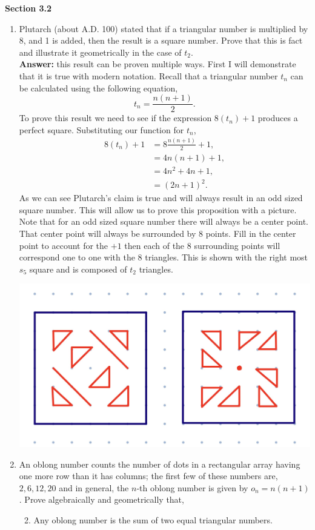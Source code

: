 \documentclass[12pt]{article}
\theoremstyle{homework}
\begin{document}
\textbf{Section 3.2}
\begin{enumerate}
\item Plutarch (about A.D. 100) stated that if a triangular number is multiplied by 8, and 1 is added, then the result is a square number. Prove that this is fact and illustrate it geometrically in the case of $t_2$.\\

\textbf{Answer:} this result can be proven multiple ways. First I will demonstrate that it is true with modern notation. Recall that a triangular number $t_n$ can be calculated using the following equation,
\begin{equation*}
  t_n = \frac{n(n+1)}{2}.
\end{equation*}
To prove this result we need to see if the expression $8(t_n) +1$ produces a perfect square. Substituting our function for $t_n$,
\begin{align*}
  8(t_n)+1 &= 8\frac{n(n+1)}{2} + 1,\\
  &= 4n(n+1) + 1,\\
  &= 4n^2 + 4n + 1,\\
  &= (2n + 1)^2.
\end{align*}
As we can see Plutarch's claim is true and will always result in an odd sized square number. This will allow us to prove this proposition with a picture. Note that
for an odd sized square number there will always be a center point. That center point will always be surrounded by 8 points. Fill in the center point to account for the $+1$ then 
each of the 8 surrounding points will correspond one to one with the 8 triangles. This is shown with the right most $s_5$ square and is composed of $t_2$ triangles. 
\begin{center}
  \includegraphics[width = .75\textwidth]{squares.jpg}        
\end{center}




\vspace{.5in}
\setcounter{enumi}{6}
\item An oblong number counts the number of dots in a rectangular array having one more row than it has columns; the first few of these numbers are, $2,6,12,20$ and in general, the $n$-th oblong number is given by $o_n=n(n+1)$. Prove algebraically and geometrically that,
\begin{enumerate}
\setcounter{enumii}{1}
\item Any oblong number is the sum of two equal triangular numbers.\\
\end{enumerate}


\end{enumerate}
\end{document}
